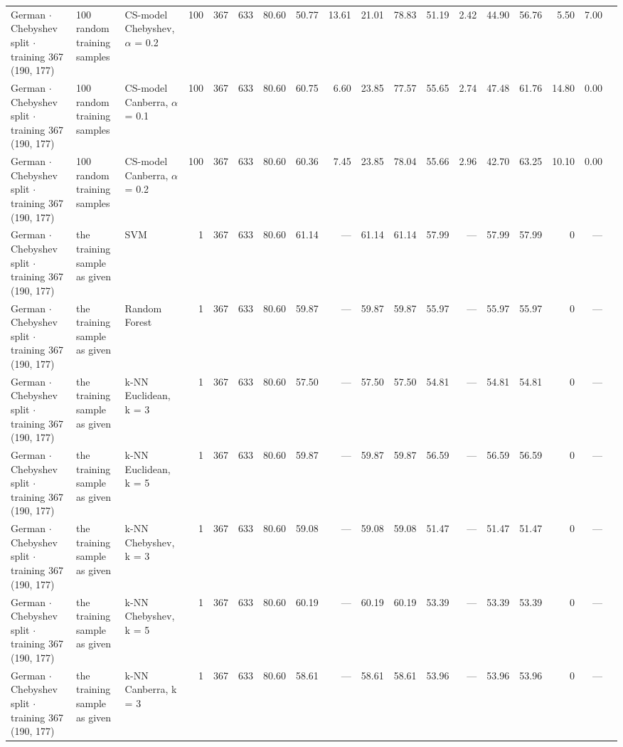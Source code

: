 \begin{longtable}{lllrrrrrrrrrrrrrrl}
  German $\cdot$ Chebyshev split $\cdot$ training 367 (190, 177) & 100 random training samples & CS-model Chebyshev, $\alpha$ = 0.2 & 100 & 367 & 633 & 80.60 & 50.77 & 13.61 & 21.01 & 78.83 & 51.19 & 2.42 & 44.90 & 56.76 & 5.50 & 7.00 &  \\
  German $\cdot$ Chebyshev split $\cdot$ training 367 (190, 177) & 100 random training samples & CS-model Canberra, $\alpha$ = 0.1 & 100 & 367 & 633 & 80.60 & 60.75 & 6.60 & 23.85 & 77.57 & 55.65 & 2.74 & 47.48 & 61.76 & 14.80 & 0.00 &  \\
  German $\cdot$ Chebyshev split $\cdot$ training 367 (190, 177) & 100 random training samples & CS-model Canberra, $\alpha$ = 0.2 & 100 & 367 & 633 & 80.60 & 60.36 & 7.45 & 23.85 & 78.04 & 55.66 & 2.96 & 42.70 & 63.25 & 10.10 & 0.00 &  \\
  German $\cdot$ Chebyshev split $\cdot$ training 367 (190, 177) & the training sample as given & SVM & 1 & 367 & 633 & 80.60 & 61.14 & --- & 61.14 & 61.14 & 57.99 & --- & 57.99 & 57.99 & 0 & --- &  \\
  German $\cdot$ Chebyshev split $\cdot$ training 367 (190, 177) & the training sample as given & Random Forest & 1 & 367 & 633 & 80.60 & 59.87 & --- & 59.87 & 59.87 & 55.97 & --- & 55.97 & 55.97 & 0 & --- &  \\
  German $\cdot$ Chebyshev split $\cdot$ training 367 (190, 177) & the training sample as given & k-NN Euclidean, k = 3 & 1 & 367 & 633 & 80.60 & 57.50 & --- & 57.50 & 57.50 & 54.81 & --- & 54.81 & 54.81 & 0 & --- &  \\
  German $\cdot$ Chebyshev split $\cdot$ training 367 (190, 177) & the training sample as given & k-NN Euclidean, k = 5 & 1 & 367 & 633 & 80.60 & 59.87 & --- & 59.87 & 59.87 & 56.59 & --- & 56.59 & 56.59 & 0 & --- &  \\
  German $\cdot$ Chebyshev split $\cdot$ training 367 (190, 177) & the training sample as given & k-NN Chebyshev, k = 3 & 1 & 367 & 633 & 80.60 & 59.08 & --- & 59.08 & 59.08 & 51.47 & --- & 51.47 & 51.47 & 0 & --- &  \\
  German $\cdot$ Chebyshev split $\cdot$ training 367 (190, 177) & the training sample as given & k-NN Chebyshev, k = 5 & 1 & 367 & 633 & 80.60 & 60.19 & --- & 60.19 & 60.19 & 53.39 & --- & 53.39 & 53.39 & 0 & --- &  \\
  German $\cdot$ Chebyshev split $\cdot$ training 367 (190, 177) & the training sample as given & k-NN Canberra, k = 3 & 1 & 367 & 633 & 80.60 & 58.61 & --- & 58.61 & 58.61 & 53.96 & --- & 53.96 & 53.96 & 0 & --- &  \\

\end{longtable}
